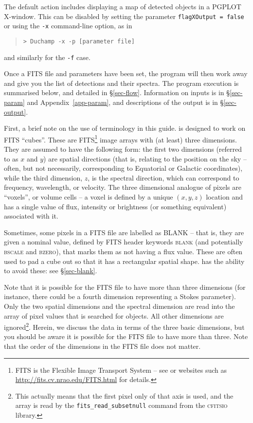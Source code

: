 The default action includes displaying a map of detected objects in a
PGPLOT X-window. This can be disabled by setting the parameter
\texttt{flagXOutput = false} or using the \texttt{-x} command-line
option, as in
\begin{quote}
{\footnotesize
\texttt{> Duchamp -x -p [parameter file]}
}
\end{quote}
and similarly for the \texttt{-f} case.

Once a FITS file and parameters have been set, the program will then
work away and give you the list of detections and their spectra. The
program execution is summarised below, and detailed in
\S\ref{sec-flow}. Information on inputs is in \S\ref{sec-param} and
Appendix~\ref{app-param}, and descriptions of the output is in
\S\ref{sec-output}.


First, a brief note on the use of terminology in this guide. \duchamp
is designed to work on FITS ``cubes''. These are FITS\footnote{FITS is
the Flexible Image Transport System -- see \citet{hanisch01} or
websites such as
\href{http://fits.cv.nrao.edu/FITS.html}{http://fits.cv.nrao.edu/FITS.html}
for details.} image arrays with (at least) three dimensions. They
are assumed to have the following form: the first two dimensions
(referred to as $x$ and $y$) are spatial directions (that is, relating
to the position on the sky -- often, but not necessarily,
corresponding to Equatorial or Galactic coordinates), while the third
dimension, $z$, is the spectral direction, which can correspond to
frequency, wavelength, or velocity. The three dimensional analogue of
pixels are ``voxels'', or volume cells -- a voxel is defined by a
unique $(x,y,z)$ location and has a single value of flux, intensity
or brightness (or something equivalent) associated with it.

Sometimes, some pixels in a FITS file are labelled as BLANK -- that
is, they are given a nominal value, defined by FITS header keywords
\textsc{blank} (and potentially \textsc{bscale} and \textsc{bzero}),
that marks them as not having a flux value. These are often used to
pad a cube out so that it has a rectangular spatial shape. \duchamp
has the ability to avoid these: see \S\ref{sec-blank}.

Note that it is possible for the FITS file to have more than three
dimensions (for instance, there could be a fourth dimension
representing a Stokes parameter). Only the two spatial dimensions and
the spectral dimension are read into the array of pixel values that is
searched for objects. All other dimensions are ignored\footnote{This
actually means that the first pixel only of that axis is used, and the
array is read by the \texttt{fits\_read\_subsetnull} command from the
\textsc{cfitsio} library.}. Herein, we discuss the data in terms of
the three basic dimensions, but you should be aware it is possible for
the FITS file to have more than three. Note that the order of the
dimensions in the FITS file does not matter.

